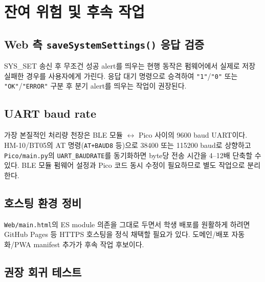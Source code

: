 \documentclass[11pt, oneside]{article}
\begin{document}
\section{잔여 위험 및 후속 작업}

\subsection{Web 측 \texttt{saveSystemSettings()} 응답 검증}

SYS\_SET 송신 후 무조건 성공 alert를 띄우는 현행 동작은 펌웨어에서
실제로 저장 실패한 경우를 사용자에게 가린다. 응답 대기 명령으로
승격하여 \texttt{"1"}/\texttt{"0"} 또는 \texttt{"OK"}/\texttt{"ERROR"}
구분 후 분기 alert를 띄우는 작업이 권장된다.

\subsection{UART baud rate}

가장 본질적인 처리량 천장은 BLE 모듈 $\leftrightarrow$ Pico 사이의 9600
baud UART이다. HM-10/BT05의 AT 명령(\texttt{AT+BAUD8} 등)으로 38400
또는 115200 baud로 상향하고 \texttt{Pico/main.py}의
\texttt{UART\_BAUDRATE}를 동기화하면 byte당 전송 시간을 4--12배 단축할
수 있다. BLE 모듈 펌웨어 설정과 Pico 코드 동시 수정이 필요하므로 별도
작업으로 분리한다.

\subsection{호스팅 환경 정비}

\texttt{Web/main.html}의 ES module 의존을 그대로 두면서 학생 배포를
원활하게 하려면 GitHub Pages 등 HTTPS 호스팅을 정식 채택할 필요가 있다.
도메인/배포 자동화/PWA manifest 추가가 후속 작업 후보이다.

\subsection{권장 회귀 테스트}
\end{document}
